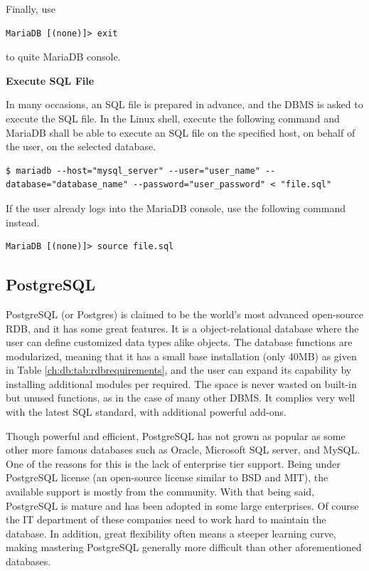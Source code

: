 Finally, use
\begin{lstlisting}
MariaDB [(none)]> exit
\end{lstlisting}
to quite MariaDB console.

\vspace{0.1in}
\noindent \textbf{Execute SQL File}
\vspace{0.1in}

In many occasions, an SQL file is prepared in advance, and the DBMS is asked to execute the SQL file. In the Linux shell, execute the following command and MariaDB shall be able to execute an SQL file on the specified host, on behalf of the user, on the selected database.
\begin{lstlisting}
$ mariadb --host="mysql_server" --user="user_name" --database="database_name" --password="user_password" < "file.sql"
\end{lstlisting}
If the user already logs into the MariaDB console, use the following command instead.
\begin{lstlisting}
MariaDB [(none)]> source file.sql
\end{lstlisting}

\subsection{PostgreSQL}

PostgreSQL (or Postgres) is claimed to be the world's most advanced open-source RDB, and it has some great features. It is a object-relational database where the user can define customized data types alike objects. The database functions are modularized, meaning that it has a small base installation (only 40MB) as given in Table \ref{ch:db:tab:rdbrequirements}, and the user can expand its capability by installing additional modules per required. The space is never wasted on built-in but unused functions, as in the case of many other DBMS. It complies very well with the latest SQL standard, with additional powerful add-ons.

Though powerful and efficient, PostgreSQL has not grown as popular as some other more famous databases such as Oracle, Microsoft SQL server, and MySQL. One of the reasons for this is the lack of enterprise tier support. Being under PostgreSQL license (an open-source license similar to BSD and MIT), the available support is mostly from the community. With that being said, PostgreSQL is mature and has been adopted in some large enterprises. Of course the IT department of these companies need to work hard to maintain the database. In addition, great flexibility often means a steeper learning curve, making mastering PostgreSQL generally more difficult than other aforementioned databases.

